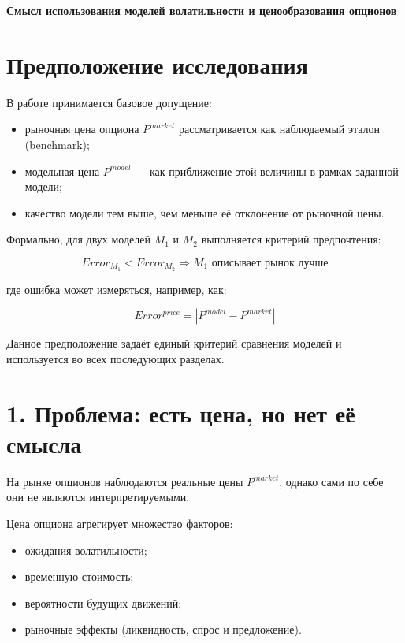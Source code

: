 \documentclass[12pt]{article}
\begin{document}
\begin{center}
    {\LARGE \textbf{Смысл использования моделей волатильности и ценообразования опционов}}
\end{center}

\section*{Предположение исследования}

В работе принимается базовое допущение:

\begin{itemize}
    \item рыночная цена опциона \(P^{market}\) рассматривается как наблюдаемый эталон (benchmark);
    \item модельная цена \(P^{model}\) --- как приближение этой величины в рамках заданной модели;
    \item качество модели тем выше, чем меньше её отклонение от рыночной цены.
\end{itemize}

Формально, для двух моделей \(M_1\) и \(M_2\) выполняется критерий предпочтения:

\[
Error_{M_1} < Error_{M_2} \Rightarrow M_1 \text{ описывает рынок лучше}
\]

где ошибка может измеряться, например, как:

\[
Error^{price} = |P^{model} - P^{market}|
\]

Данное предположение задаёт единый критерий сравнения моделей и используется во всех последующих разделах.

\section*{1. Проблема: есть цена, но нет её смысла}

На рынке опционов наблюдаются реальные цены \(P^{market}\), однако сами по себе они не являются интерпретируемыми.

Цена опциона агрегирует множество факторов:

\begin{itemize}
    \item ожидания волатильности;
    \item временную стоимость;
    \item вероятности будущих движений;
    \item рыночные эффекты (ликвидность, спрос и предложение).
\end{itemize}
\end{document}
